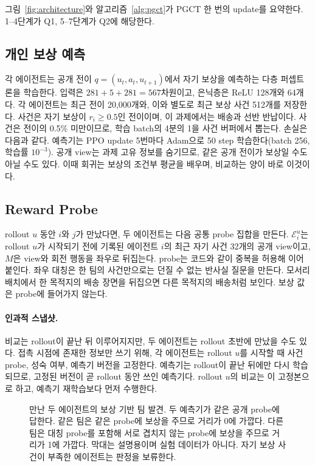 \documentclass[10pt,twocolumn,letterpaper]{article}
\begin{document}
그림~\ref{fig:architecture}와 알고리즘~\ref{alg:pgct}가 PGCT 한 번의 update를 요약한다. 1--4단계가 Q1, 5--7단계가 Q2에 해당한다.

\subsection{개인 보상 예측}
각 에이전트는 공개 전이 $q=(u_t,a_t,u_{t+1})$에서 자기 보상을 예측하는 다층 퍼셉트론을 학습한다.
\ModelEquation
입력은 $281+5+281=567$차원이고, 은닉층은 ReLU 128개와 64개다. 각 에이전트는 최근 전이 20{,}000개와, 이와 별도로 최근 보상 사건 512개를 저장한다. 사건은 자기 보상이 $r_i\ge0.5$인 전이이며, 이 과제에서는 배송과 선반 반납이다. 사건은 전이의 0.5\% 미만이므로, 학습 batch의 4분의 1을 사건 버퍼에서 뽑는다. 손실은 다음과 같다.
\RewardLossEquation
예측기는 PPO update 5번마다 Adam으로 50 step 학습한다(batch 256, 학습률 $10^{-3}$). 공개 view는 과제 고유 정보를 숨기므로, 같은 공개 전이가 보상일 수도 아닐 수도 있다. 이때 회귀는 보상의 조건부 평균을 배우며, 비교하는 양이 바로 이것이다.

\subsection{Reward Probe}
rollout $u$ 동안 $i$와 $j$가 만났다면, 두 에이전트는 다음 공통 probe 집합을 만든다.
\ProbeEquation
$\mathcal E_i^u$는 rollout $u$가 시작되기 전에 기록된 에이전트 $i$의 최근 자기 사건 32개의 공개 view이고, $M$은 view와 회전 행동을 좌우로 뒤집는다. probe는 코드와 같이 중복을 허용해 이어 붙인다. 좌우 대칭은 한 팀의 사건만으로는 던질 수 없는 반사실 질문을 만든다. 모서리 배치에서 한 목적지의 배송 장면을 뒤집으면 다른 목적지의 배송처럼 보인다. 보상 값은 probe에 들어가지 않는다.

\paragraph{인과적 스냅샷.}
비교는 rollout이 끝난 뒤 이루어지지만, 두 에이전트는 rollout 초반에 만났을 수도 있다. 접촉 시점에 존재한 정보만 쓰기 위해, 각 에이전트는 rollout $u$를 시작할 때 사건 probe, 성숙 여부, 예측기 버전을 고정한다. 예측기는 rollout이 끝난 뒤에만 다시 학습되므로, 고정된 버전이 곧 rollout 동안 쓰인 예측기다. rollout $u$의 비교는 이 고정본으로 하고, 예측기 재학습보다 먼저 수행한다.

\begin{figure}[t]
\centering\resizebox{.97\textwidth}{!}{}
\caption{만난 두 에이전트의 보상 기반 팀 발견. 두 예측기가 같은 공개 probe에 답한다. 같은 팀은 같은 probe에 보상을 주므로 거리가 0에 가깝다. 다른 팀은 대칭 probe를 포함해 서로 겹치지 않는 probe에 보상을 주므로 거리가 1에 가깝다. 막대는 설명용이며 실험 데이터가 아니다. 자기 보상 사건이 부족한 에이전트는 판정을 보류한다.}\label{fig:discovery}
\end{figure}
\end{document}
